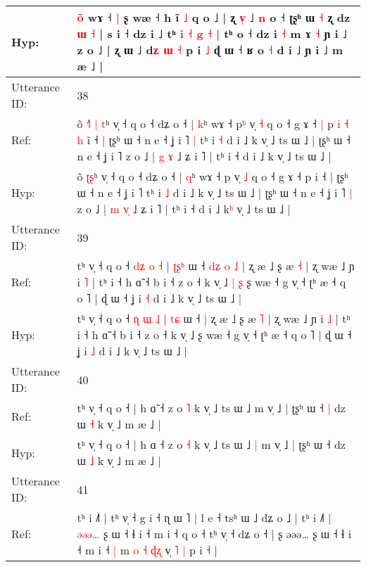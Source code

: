 \documentclass[10pt]{article}
\DeclareRobustCommand{\hl}[1]{{\textcolor{red}{#1}}}
\begin{document}
\begin{longtable}{ll}
 \\
Hyp: & \hl{o}\hl{̃} wɤ ˧\hl{ }\hl{|} ʂ wæ ˧ h ĩ \hl{˩} q o ˩ | ʐ \hl{v}\hl{̩} ˩ \hl{n} o ˧ ʈʂʰ ɯ\hl{}\hl{} \hl{˧} ʐ\hl{}\hl{}\hl{}\hl{} dz \hl{ɯ} \hl{˧} | s i ˧ dz i ˩ tʰ\hl{ }\hl{i} \hl{˧}\hl{ }\hl{g} \hl{˧} \hl{|} tʰ o ˧ dz i \hl{˧} m ɤ \hl{˧} ɲ i ˩ z o ˩ | ʐ ɯ ˩ d\hl{}\hl{}\hl{ʑ} \hl{ɯ} \hl{˧} p i\hl{}\hl{} \hl{˩} ɖ ɯ ˧ ʁ o \hl{˧} d i ˩ ɲ i ˩ m æ ˩ |
 \\
\midrule
Utterance ID: & 38 \\
Ref: & õ\hl{ }\hl{˧}\hl{˥} \hl{|}\hl{ }\hl{t}ʰ v̩ ˧ q o ˧ dʑ o ˧ | \hl{k}ʰ wɤ ˧ p\hl{ʰ} v̩ \hl{˧} q o ˧ g ɤ ˧\hl{ }\hl{|} p\hl{ }\hl{i}\hl{ }\hl{˧}\hl{ }\hl{h} i\hl{̃} ˧ | ʈʂʰ ɯ ˧ n e ˧ ʝ i ˥\hl{ }\hl{|} tʰ i \hl{˧} d i ˩ k v̩ ˩ ts ɯ ˩ | ʈʂʰ ɯ ˧ n e ˧ ʝ i ˥\hl{}\hl{} z o ˩ | \hl{g} \hl{}\hl{ɤ} ˩ ʑ i ˥ | tʰ i ˧ d i ˩ k\hl{} v̩ ˩ ts ɯ ˩ |
 \\
Hyp: & õ\hl{}\hl{}\hl{} \hl{}\hl{ʈ}\hl{ʂ}ʰ v̩ ˧ q o ˧ dʑ o ˧ | \hl{q}ʰ wɤ ˧ p\hl{} v̩ \hl{˩} q o ˧ g ɤ ˧\hl{}\hl{} p\hl{}\hl{}\hl{}\hl{}\hl{}\hl{} i\hl{} ˧ | ʈʂʰ ɯ ˧ n e ˧ ʝ i ˥\hl{}\hl{} tʰ i \hl{˩} d i ˩ k v̩ ˩ ts ɯ ˩ | ʈʂʰ ɯ ˧ n e ˧ ʝ i ˥\hl{ }\hl{|} z o ˩ | \hl{m} \hl{v}\hl{̩} ˩ ʑ i ˥ | tʰ i ˧ d i ˩ k\hl{ʰ} v̩ ˩ ts ɯ ˩ |
 \\
\midrule
Utterance ID: & 39 \\
Ref: & tʰ v̩ ˧ q o ˧ \hl{d}\hl{ʑ} \hl{o} \hl{˧} | \hl{ʈ}\hl{ʂ}\hl{ʰ} ɯ ˧\hl{ }\hl{d}\hl{ʑ}\hl{ }\hl{o}\hl{ }\hl{˩} | ʐ æ ˩ ʂ æ \hl{˧} | ʐ wæ ˩ ɲ i \hl{˥} | tʰ i ˧ h ɑ̃ ˧ b i ˧ z o ˧ k v̩ ˩\hl{ }\hl{|}\hl{ }\hl{ʂ} ʂ wæ ˧ g v̩ ˧ ʈʰ æ ˧ q o ˥ | ɖ ɯ ˧ ʝ i \hl{˧} d i ˩ k v̩ ˩ ts ɯ ˩ |
 \\
Hyp: & tʰ v̩ ˧ q o ˧ \hl{}\hl{ɳ} \hl{ɯ} \hl{˩} | \hl{}\hl{t}\hl{ɕ} ɯ ˧\hl{}\hl{}\hl{}\hl{}\hl{}\hl{}\hl{} | ʐ æ ˩ ʂ æ \hl{˥} | ʐ wæ ˩ ɲ i \hl{˩} | tʰ i ˧ h ɑ̃ ˧ b i ˧ z o ˧ k v̩ ˩\hl{}\hl{}\hl{}\hl{} ʂ wæ ˧ g v̩ ˧ ʈʰ æ ˧ q o ˥ | ɖ ɯ ˧ ʝ i \hl{˩} d i ˩ k v̩ ˩ ts ɯ ˩ |
 \\
\midrule
Utterance ID: & 40 \\
Ref: & tʰ v̩ ˧ q o ˧ | h ɑ\hl{̃} ˧ z o \hl{˥} k v̩ ˩ ts ɯ ˩\hl{}\hl{} m v̩ ˩ | ʈʂʰ ɯ ˧\hl{ }\hl{|} dz ɯ \hl{˧} k v̩ ˩ m æ ˩ |
 \\
Hyp: & tʰ v̩ ˧ q o ˧ | h ɑ\hl{} ˧ z o \hl{˧} k v̩ ˩ ts ɯ ˩\hl{ }\hl{|} m v̩ ˩ | ʈʂʰ ɯ ˧\hl{}\hl{} dz ɯ \hl{˩} k v̩ ˩ m æ ˩ |
 \\
\midrule
Utterance ID: & 41 \\
Ref: & tʰ i ˩˥ | tʰ v̩ ˧ g i ˧ ɳ ɯ ˥ | l e ˧ tsʰ ɯ ˩ dʑ o ˩ | tʰ i ˩˥ |\hl{ }\hl{ə}\hl{ə}\hl{ə}\hl{…} ʂ ɯ ˧ ɬ i ˧ m i ˧ q o ˧ tʰ v̩ ˧ dʑ o ˧ | ʂ əəə… ʂ ɯ ˧ ɬ i ˧ m i ˧\hl{ }\hl{|} m \hl{o}\hl{ }\hl{˧} \hl{ɖ}\hl{ʐ} v̩\hl{ }\hl{˥} \hl{|} p i \hl{˧} |

\end{longtable}
\end{document}
